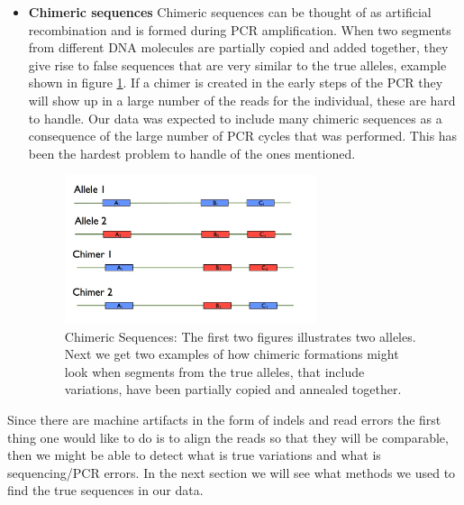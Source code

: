\begin{itemize}
	The 454 instrument will, especially in homopolymeric regions, make false insertions and/or deletions, this is a well known drawback of this technology \cite{454_problems}. As an example of this problem we observed in our dataset that a conserved part of the sequence has a homopolymer with 5 consecutive C:s. We found that, out of all reads, 0.03\% had one C, 0.1\% two C:s, 30\% three, 56\% four and only 13\% showed all five C:s.	It might be true deletions but in this case it seems highly unlikely since all earlier observed reference sequences had 5 C:s in these positions.
	  
	\item \textbf{Chimeric sequences}
	Chimeric sequences can be thought of as artificial recombination and is formed during PCR amplification. When two segments from different {DNA} molecules are partially copied and added together, they give rise to false sequences that are very similar to the true alleles, example shown in figure \ref{fig:chimeric_sequences}. If a chimer is created in the early steps of the PCR they will show up in a large number of the reads for the individual, these are hard to handle. Our data was expected to include many chimeric sequences as a consequence of the large number of PCR cycles that was performed. This has been the hardest problem to handle of the ones mentioned.

	\begin{figure}[ht]
		\centering
			\includegraphics[width=0.7\textwidth]{../pictures/Chimers.jpg}
		\caption{Chimeric Sequences: The first two figures illustrates two alleles. Next we get two examples of how chimeric formations might look when segments from the true alleles, that include variations, have been partially copied and annealed together.}
		\label{fig:chimeric_sequences}
	\end{figure}

\end{itemize}


Since there are machine artifacts in the form of indels and read errors the first thing one would like to do is to align the reads so that they will be comparable, then we might be able to detect what is true variations and what is sequencing/PCR errors. In the next section we will see what methods we used to find the true sequences in our data.
